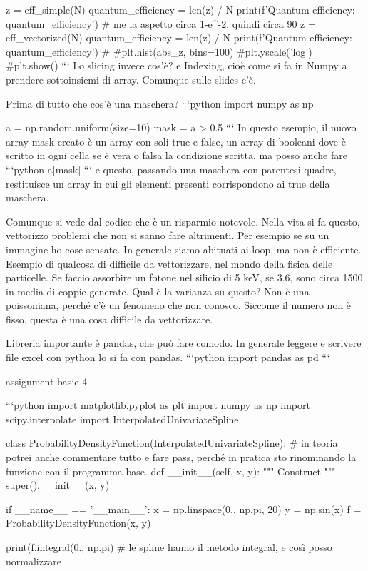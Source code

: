 \documentclass[10pt, a4paper, twosided, titlepage, draft]{book}
\begin{document}
z = eff_simple(N)
quantum_efficiency = len(z) / N
print(f'Quantum efficiency: {quantum_efficiency}')
# me la aspetto circa 1-e^-2, quindi circa 90%
z = eff_vectorized(N)
quantum_efficiency = len(z) / N
print(f'Quantum efficiency: {quantum_efficiency}')
#
#plt.hist(abs_z, bins=100)
#plt.yscale('log')
#plt.show()
```
Lo slicing invece cos'è? e Indexing, cioè come si fa in Numpy a prendere sottoinsiemi di array. Comunque sulle slides c'è.

Prima di tutto che cos'è una maschera? 
```python
import numpy as np

a = np.random.uniform(size=10)
mask = a > 0.5
```
In questo esempio, il nuovo array mask creato è un array con soli true e false, un array di booleani dove è scritto in ogni cella se è vera o falsa la condizione scritta.
ma posso anche fare
```python
a[mask]
```
e questo, passando una maschera con parentesi quadre, restituisce un array in cui gli elementi presenti corrispondono ai true della maschera.

Comunque si vede dal codice che è un risparmio notevole. Nella vita si fa questo, vettorizzo problemi che non si sanno fare altrimenti.
Per esempio se su un immagine ho cose sensate. In generale siamo abituati ai loop, ma non è efficiente.
Esempio di qualcosa di difficile da vettorizzare, nel mondo della fisica delle particelle.
Se faccio assorbire un fotone nel silicio di 5 keV, se 3.6, sono circa 1500 in media di coppie generate. Qual è la varianza su questo? Non è una poissoniana, perché c'è un fenomeno che non conosco. 
Siccome il numero non è fisso, questa è una cosa difficile da vettorizzare.

Libreria importante è pandas, che può fare comodo.
In generale leggere e scrivere file excel con python lo si fa con pandas.
```python
import pandas as pd
```

assignment basic 4

```python
import matplotlib.pyplot as plt
import numpy as np
import scipy.interpolate import InterpolatedUnivariateSpline

class ProbabilityDensityFunction(InterpolatedUnivariateSpline):
# in teoria potrei anche commentare tutto e fare pass, perché in pratica sto rinominando la funzione con il programma base.
def __init__(self, x, y):
""" Construct
"""
super().__init__(x, y)

if __name__ == '__main__':
x = np.linspace(0., np.pi, 20)
y = np.sin(x)
f = ProbabilityDensityFunction(x, y)

print(f.integral(0., np.pi) # le spline hanno il metodo integral, e così posso normalizzare
\end{document}
